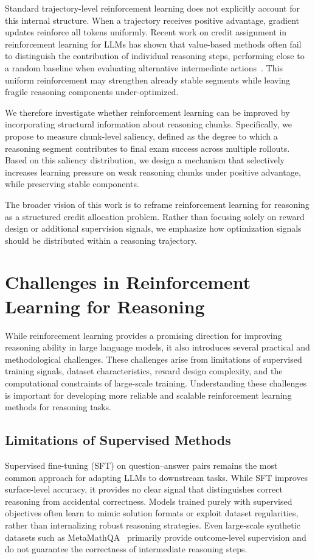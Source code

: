 \documentclass[12pt]{report}
\begin{document}
Standard trajectory-level reinforcement learning does not explicitly account for this internal structure. 
When a trajectory receives positive advantage, gradient updates reinforce all tokens uniformly. 
Recent work on credit assignment in reinforcement learning for LLMs has shown that value-based methods often fail to distinguish the contribution of individual reasoning steps, performing close to a random baseline when evaluating alternative intermediate actions~\cite{kazemnejad2025vinepporefiningcreditassignment}.
This uniform reinforcement may strengthen already stable segments while leaving fragile reasoning components under-optimized.

We therefore investigate whether reinforcement learning can be improved by incorporating structural information about reasoning chunks. 
Specifically, we propose to measure chunk-level saliency, defined as the degree to which a reasoning segment contributes to final exam success across multiple rollouts. 
Based on this saliency distribution, we design a mechanism that selectively increases learning pressure on weak reasoning chunks under positive advantage, while preserving stable components.

The broader vision of this work is to reframe reinforcement learning for reasoning as a structured credit allocation problem. 
Rather than focusing solely on reward design or additional supervision signals, we emphasize how optimization signals should be distributed within a reasoning trajectory.


\section{Challenges in Reinforcement Learning for Reasoning}
While reinforcement learning provides a promising direction for improving reasoning ability in large language models, it also introduces several practical and methodological challenges. 
These challenges arise from limitations of supervised training signals, dataset characteristics, reward design complexity, and the computational constraints of large-scale training. 
Understanding these challenges is important for developing more reliable and scalable reinforcement learning methods for reasoning tasks.

\subsection{Limitations of Supervised Methods}
Supervised fine-tuning (SFT) on question–answer pairs remains the most common approach for adapting LLMs to downstream tasks. While SFT improves surface-level accuracy, it provides no clear signal that distinguishes correct reasoning from accidental correctness. Models trained purely with supervised objectives often learn to mimic solution formats or exploit dataset regularities, rather than internalizing robust reasoning strategies. Even large-scale synthetic datasets such as MetaMathQA~\cite{yu2024metamathbootstrapmathematicalquestions} primarily provide outcome-level supervision and do not guarantee the correctness of intermediate reasoning steps.
\end{document}
